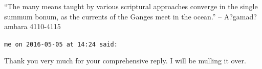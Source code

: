 \begin{footnotesize}
\begin{sffamily}
``The many means taught by various scriptural approaches converge in the single summum bonum, as the currents of the Ganges meet in the ocean.'' -- A?gamad?ambara 4110-4115

\hfill

\texttt{me on 2016-05-05 at 14:24 said:}

Thank you very much for your comprehensive reply. I will be mulling it over.

\end{sffamily}
\end{footnotesize}

